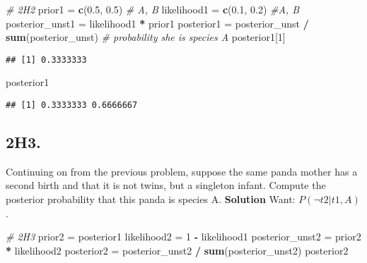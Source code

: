 \documentclass[
]{book}
\newenvironment{Shaded}{\begin{snugshade}}{\end{snugshade}}
\newcommand{\CommentTok}[1]{\textcolor[rgb]{0.56,0.35,0.01}{\textit{#1}}}
\newcommand{\DecValTok}[1]{\textcolor[rgb]{0.00,0.00,0.81}{#1}}
\newcommand{\FloatTok}[1]{\textcolor[rgb]{0.00,0.00,0.81}{#1}}
\newcommand{\KeywordTok}[1]{\textcolor[rgb]{0.13,0.29,0.53}{\textbf{#1}}}
\newcommand{\NormalTok}[1]{#1}
\newcommand{\OperatorTok}[1]{\textcolor[rgb]{0.81,0.36,0.00}{\textbf{#1}}}
\newcommand{\StringTok}[1]{\textcolor[rgb]{0.31,0.60,0.02}{#1}}
\begin{document}
\begin{Shaded}
\begin{Highlighting}[]
\CommentTok{# 2H2}
\NormalTok{prior1 =}\StringTok{ }\KeywordTok{c}\NormalTok{(}\FloatTok{0.5}\NormalTok{, }\FloatTok{0.5}\NormalTok{) }\CommentTok{# A, B}
\NormalTok{likelihood1 =}\StringTok{ }\KeywordTok{c}\NormalTok{(}\FloatTok{0.1}\NormalTok{, }\FloatTok{0.2}\NormalTok{) }\CommentTok{#A, B}
\NormalTok{posterior_unst1 =}\StringTok{ }\NormalTok{likelihood1 }\OperatorTok{*}\StringTok{ }\NormalTok{prior1}
\NormalTok{posterior1 =}\StringTok{ }\NormalTok{posterior_unst }\OperatorTok{/}\StringTok{ }\KeywordTok{sum}\NormalTok{(posterior_unst)}
\CommentTok{# probability she is species A}
\NormalTok{posterior1[}\DecValTok{1}\NormalTok{]}
\end{Highlighting}
\end{Shaded}

\begin{verbatim}
## [1] 0.3333333
\end{verbatim}

\begin{Shaded}
\begin{Highlighting}[]
\NormalTok{posterior1}
\end{Highlighting}
\end{Shaded}

\begin{verbatim}
## [1] 0.3333333 0.6666667
\end{verbatim}

\hypertarget{h3.}{%
\subsection{2H3.}\label{h3.}}

Continuing on from the previous problem, suppose the same panda mother has a second birth and that it is not twins, but a singleton infant. Compute the posterior probability that this panda is species A.
\textbf{Solution}
Want: \(P(\neg t2|t1,A)\).

\begin{Shaded}
\begin{Highlighting}[]
\CommentTok{# 2H3}
\NormalTok{prior2 =}\StringTok{ }\NormalTok{posterior1}
\NormalTok{likelihood2 =}\StringTok{ }\DecValTok{1} \OperatorTok{-}\StringTok{ }\NormalTok{likelihood1}
\NormalTok{posterior_unst2 =}\StringTok{ }\NormalTok{prior2 }\OperatorTok{*}\StringTok{ }\NormalTok{likelihood2}
\NormalTok{posterior2 =}\StringTok{ }\NormalTok{posterior_unst2 }\OperatorTok{/}\StringTok{ }\KeywordTok{sum}\NormalTok{(posterior_unst2)}
\NormalTok{posterior2}
\end{Highlighting}
\end{Shaded}
\end{document}

